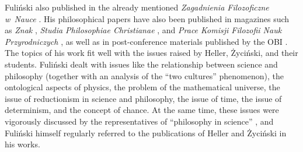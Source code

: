 Fuliński also published in the already mentioned \textit{Zagadnienia Filozoficzne w~Nauce} 
\parencites[][]{fulinski_profesor_2015}[][]{fulinski_fluktuujacy_2017}. %
 His philosophical papers have also been published in magazines such as \textit{Znak} 
\parencite[][]{fulinski_o_1993}, %
 \textit{Studia Philosophiae Christianae} 
\parencite[][]{fulinski_maszyna_1989}, %
 and \textit{Prace Komisji Filozofii Nauk Przyrodniczych} 
\parencite[][]{fulinski_czy_2010}, %
 as well as in post-conference materials published by the OBI 
\parencites[e.g][]{janik_glos_1990}[][]{heller_co_1991}[][]{heller_jednosc_2003-2}. %
 The topics of his work fit well with the issues raised by Heller, Życiński, and their students. Fuliński dealt with issues like the relationship between science and philosophy (together with an analysis of the ``two cultures'' phenomenon), the ontological aspects of physics, the problem of the mathematical universe, the issue of reductionism in science and philosophy, the issue of time, the issue of determinism, and the concept of chance. At the same time, these issues were vigorously discussed by the representatives of ``philosophy in science'' 
\parencite[e.g][pp.222–223]{trombik_koncepcje_2021}, %
 and Fuliński himself regularly referred to the publications of Heller and Życiński in his works.



